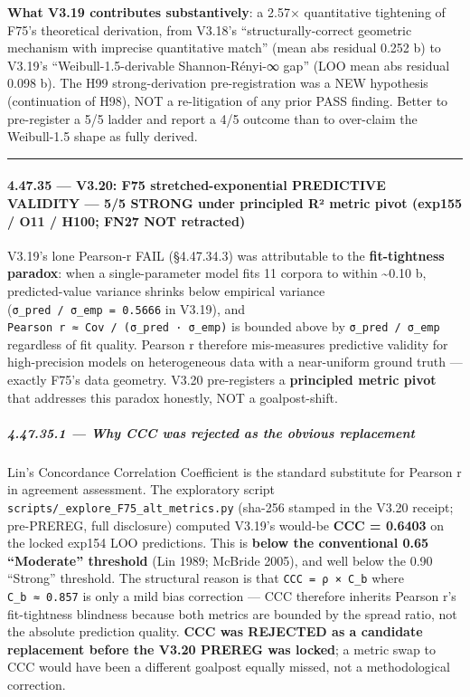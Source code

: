 \documentclass[
]{article}
\begin{document}
\textbf{What V3.19 contributes substantively}: a 2.57× quantitative
tightening of F75's theoretical derivation, from V3.18's
``structurally-correct geometric mechanism with imprecise quantitative
match'' (mean abs residual 0.252 b) to V3.19's ``Weibull-1.5-derivable
Shannon-Rényi-∞ gap'' (LOO mean abs residual 0.098 b). The H99
strong-derivation pre-registration was a NEW hypothesis (continuation of
H98), NOT a re-litigation of any prior PASS finding. Better to
pre-register a 5/5 ladder and report a 4/5 outcome than to over-claim
the Weibull-1.5 shape as fully derived.

\begin{center}\rule{0.5\linewidth}{0.5pt}\end{center}

\paragraph{4.47.35 --- V3.20: F75 stretched-exponential PREDICTIVE
VALIDITY --- 5/5 STRONG under principled R² metric pivot (exp155 / O11 /
H100; FN27 NOT
retracted)}\label{v3.20-f75-stretched-exponential-predictive-validity-55-strong-under-principled-ruxb2-metric-pivot-exp155-o11-h100-fn27-not-retracted}

V3.19's lone Pearson-r FAIL (§4.47.34.3) was attributable to the
\textbf{fit-tightness paradox}: when a single-parameter model fits 11
corpora to within \textasciitilde0.10 b, predicted-value variance
shrinks below empirical variance (\texttt{σ\_pred\ /\ σ\_emp\ =\ 0.5666}
in V3.19), and \texttt{Pearson\ r\ ≈\ Cov\ /\ (σ\_pred\ ·\ σ\_emp)} is
bounded above by \texttt{σ\_pred\ /\ σ\_emp} regardless of fit quality.
Pearson r therefore mis-measures predictive validity for high-precision
models on heterogeneous data with a near-uniform ground truth ---
exactly F75's data geometry. V3.20 pre-registers a \textbf{principled
metric pivot} that addresses this paradox honestly, NOT a
goalpost-shift.

\subparagraph{4.47.35.1 --- Why CCC was rejected as the obvious
replacement}\label{why-ccc-was-rejected-as-the-obvious-replacement}

Lin's Concordance Correlation Coefficient is the standard substitute for
Pearson r in agreement assessment. The exploratory script
\texttt{scripts/\_explore\_F75\_alt\_metrics.py} (sha-256 stamped in the
V3.20 receipt; pre-PREREG, full disclosure) computed V3.19's would-be
\textbf{CCC = 0.6403} on the locked exp154 LOO predictions. This is
\textbf{below the conventional 0.65 ``Moderate'' threshold} (Lin 1989;
McBride 2005), and well below the 0.90 ``Strong'' threshold. The
structural reason is that \texttt{CCC\ =\ ρ\ ×\ C\_b} where
\texttt{C\_b\ ≈\ 0.857} is only a mild bias correction --- CCC therefore
inherits Pearson r's fit-tightness blindness because both metrics are
bounded by the spread ratio, not the absolute prediction quality.
\textbf{CCC was REJECTED as a candidate replacement before the V3.20
PREREG was locked}; a metric swap to CCC would have been a different
goalpost equally missed, not a methodological correction.
\end{document}
